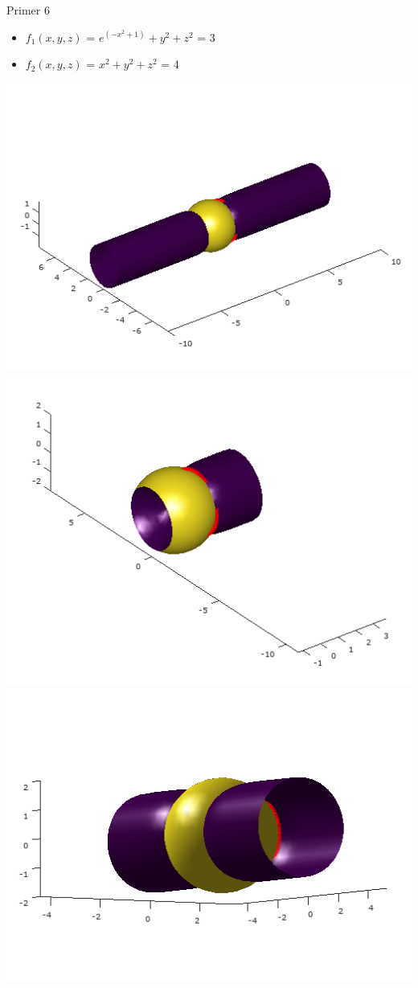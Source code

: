 \documentclass{beamer}
\begin{document}
\begin{frame}{Primer 6}
	\begin{itemize}  
		\item $f_{1}(x,y,z)$ = $e^{(-x^{2}+1)}+y^{2}+z^{2}$ = 3
		\item $f_{2}(x,y,z)$ = $x^2 + y^2 + z^2$ = 4
	\end{itemize} 
	\includegraphics[scale=0.3]{primer6_1}
	\includegraphics[scale=0.3]{primer6_2}
	\includegraphics[scale=0.3]{primer6_3} 
\end{frame}
\end{document}

